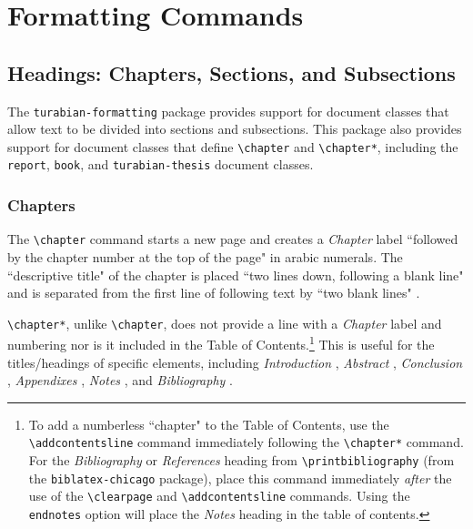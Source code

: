 \documentclass{article}
\begin{document}
\section{Formatting Commands}
\label{sec:formatting_commands}


\subsection{Headings: Chapters, Sections, and Subsections}

The \texttt{turabian-formatting} package provides support for document classes that allow text to be divided into sections and subsections. This package also provides support for document classes that define \texttt{\textbackslash chapter} and \texttt{\textbackslash chapter*}, including the \texttt{report}, \texttt{book}, and \texttt{turabian-thesis} document classes.

\subsubsection*{Chapters}

The \texttt{\textbackslash chapter} command starts a new page and creates a \emph{Chapter} label ``followed by the chapter number at the top of the page" in arabic numerals. The ``descriptive title" of the chapter is placed ``two lines down, following a blank line" and is separated from the first line of following text by ``two blank lines" \autocite[391]{turabian_manual_2013}.

\texttt{\textbackslash chapter*}, unlike \texttt{\textbackslash chapter}, does not provide a line with a \emph{Chapter} label and numbering nor is it included in the Table of Contents.\footnote{%
	To add a numberless ``chapter" to the Table of Contents, use the \texttt{\textbackslash addcontentsline} command immediately following the \texttt{\textbackslash chapter*} command. For the \emph{Bibliography} or \emph{References} heading from \texttt{\textbackslash printbibliography} (from the \texttt{biblatex-chicago} package), place this command immediately \emph{after} the use of the \texttt{\textbackslash clearpage} and \texttt{\textbackslash addcontentsline} commands. Using the \texttt{endnotes} option will place the \emph{Notes} heading in the table of contents.}
This is useful for the titles/headings of specific elements, including \emph{Introduction} \autocite[390]{turabian_manual_2013}, \emph{Abstract} \autocite[389]{turabian_manual_2013}, \emph{Conclusion} \autocite[398]{turabian_manual_2013}, \emph{Appendixes} \autocite[398]{turabian_manual_2013}, \emph{Notes} \autocite[399]{turabian_manual_2013}, and \emph{Bibliography} \autocite[401]{turabian_manual_2013}.
\end{document}

